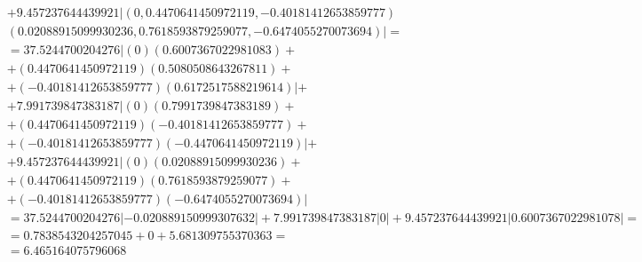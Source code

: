 \documentclass[a4paper]{article}
\begin{document}
\begin{align*}
		\\
		&+ 9.457237644439921| (0, 0.4470641450972119, -0.40181412653859777)\\& (0.02088915099930236, 0.7618593879259077, -0.6474055270073694) |=
		\\
		&=37.5244700204276 | (0)(0.6007367022981083) +\\&+ (0.4470641450972119)(0.5080508643267811) +\\&+ (-0.40181412653859777)(0.6172517588219614)  |+
		\\
		& +7.991739847383187 | (0)(0.7991739847383189) +\\&+ (0.4470641450972119)(-0.40181412653859777) +\\&+ (-0.40181412653859777)(-0.4470641450972119)  | +
		\\
		& +9.457237644439921 | (0)(0.02088915099930236) +\\&+ (0.4470641450972119)(0.7618593879259077) +\\&+ (-0.40181412653859777)(-0.6474055270073694)  | 
		\\
		&= 37.5244700204276| -0.020889150999307632 | +
		7.991739847383187| 0 |+
		9.457237644439921| 0.6007367022981078 |=
		\\
		&=0.7838543204257045 +
		0 +
		5.681309755370363 =
		\\
		&=6.465164075796068 
		\\
	\end{align*}
\end{document}
